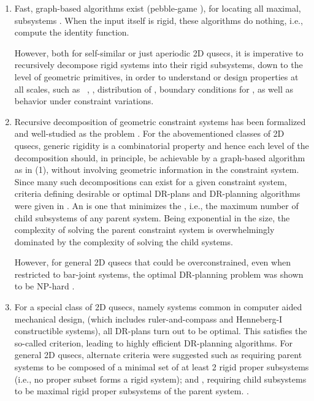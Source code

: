 \begin{enumerate}
    \item
    Fast, graph-based algorithms exist (pebble-game \cite{Jacobs:1997:PG,lee2005finding}), for locating all maximal,  subsystems \seedefs. When the input itself is rigid, these algorithms do nothing, i.e., compute the identity function.

    However, both for self-similar or just aperiodic 2D qusecs, it is imperative to recursively decompose rigid systems into their rigid subsystems, down to the level of geometric primitives, in order to understand or design properties at all scales, such as \seedefs\ , , distribution of , boundary conditions for , as well as behavior under constraint variations.

    \item
    Recursive decomposition of geometric constraint systems has been formalized \cite{hoffman2001decompositionI,hoffman2001decompositionII} and well-studied \cite{jermann2006decomposition,sitharam2005combinatorial} as the  problem \seedefsprelim. For the abovementioned classes of 2D qusecs, generic rigidity is a combinatorial property and hence each level of the decomposition should, in principle, be achievable by a graph-based algorithm as in (1), without involving geometric information in the constraint system. Since many such decompositions can exist for a given constraint system, criteria defining desirable or optimal DR-plans and DR-planning algorithms were given in \cite{hoffman2001decompositionI}. An  is one that minimizes the  \seedefsprelim, i.e., the maximum number of child subsystems of any parent system. Being exponential in the size, the complexity of solving the parent constraint system is overwhelmingly dominated by the complexity of solving the child systems.

    However, for general 2D qusecs that could be overconstrained, even when restricted to bar-joint systems, the optimal DR-planning problem was shown to be NP-hard \cite{lomonosov2004graph}.

    \item
    For a special class of 2D qusecs, namely  systems  \cite{fudos1997graph,owen1991algebraic,joan-arinyo2004revisiting}  common in computer aided mechanical design, (which includes ruler-and-compass and Henneberg-I constructible systems), all DR-plans turn out to be optimal. This satisfies the so-called  criterion, leading to highly efficient DR-planning algorithms. For general 2D qusecs, alternate criteria were suggested such as  requiring parent systems to be composed of a minimal set of at least 2 rigid proper subsystems (i.e., no proper subset forms a rigid system); and , requiring child subsystems to be maximal rigid proper subsystems of the parent system. \seedefsc.


\end{enumerate}
